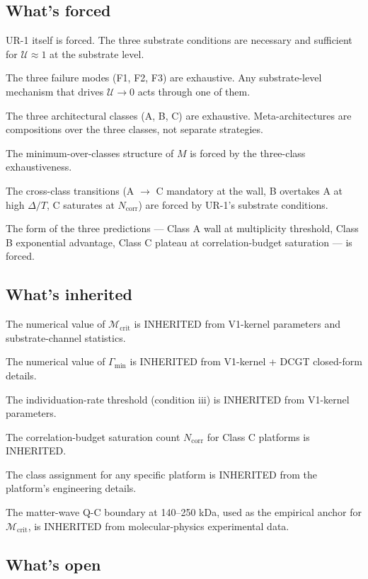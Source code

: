 \documentclass[11pt,a4paper]{article}
\begin{document}
\subsection{What's forced}

UR-1 itself is forced. The three substrate conditions are necessary and sufficient for $\mathcal{U} \approx 1$ at the substrate level.

The three failure modes (F1, F2, F3) are exhaustive. Any substrate-level mechanism that drives $\mathcal{U} \to 0$ acts through one of them.

The three architectural classes (A, B, C) are exhaustive. Meta-architectures are compositions over the three classes, not separate strategies.

The minimum-over-classes structure of $M$ is forced by the three-class exhaustiveness.

The cross-class transitions (A $\to$ C mandatory at the wall, B overtakes A at high $\Delta/T$, C saturates at $N_{\mathrm{corr}}$) are forced by UR-1's substrate conditions.

The form of the three predictions --- Class A wall at multiplicity threshold, Class B exponential advantage, Class C plateau at correlation-budget saturation --- is forced.

\subsection{What's inherited}

The numerical value of $\mathcal{M}_{\mathrm{crit}}$ is INHERITED from V1-kernel parameters and substrate-channel statistics.

The numerical value of $\Gamma_{\min}$ is INHERITED from V1-kernel + DCGT closed-form details.

The individuation-rate threshold (condition iii) is INHERITED from V1-kernel parameters.

The correlation-budget saturation count $N_{\mathrm{corr}}$ for Class C platforms is INHERITED.

The class assignment for any specific platform is INHERITED from the platform's engineering details.

The matter-wave Q-C boundary at 140--250 kDa, used as the empirical anchor for $\mathcal{M}_{\mathrm{crit}}$, is INHERITED from molecular-physics experimental data.

\subsection{What's open}
\end{document}
